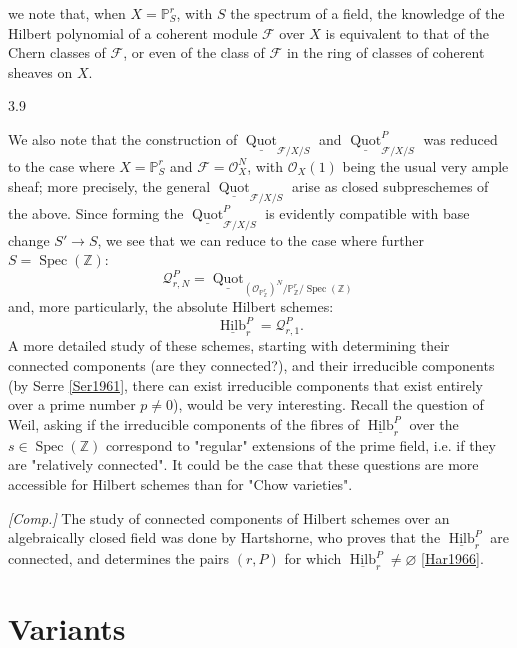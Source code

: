   we note that, when \(X=\mathbb {P}_S^r\), with \(S\) the spectrum of a field, the knowledge of the Hilbert polynomial of a coherent module \(\mathscr {F}\) over \(X\) is equivalent to that of the Chern classes of \(\mathscr {F}\), or even of the class of \(\mathscr {F}\) in the ring of classes of coherent sheaves on \(X\).\begin{remarks}{3.9}\label{fga3.iv-3-remarks-3.9}\skipsinglepar\par{}We also note that the construction of \(\underline {\operatorname {Quot}}_{{\mathscr {F}/X/S}}\) and \(\underline {\operatorname {Quot}}_{{\mathscr {F}/X/S}}^P\) was reduced to the case where \(X=\mathbb {P}_S^r\) and \(\mathscr {F}=\mathcal {O}_X^N\), with \(\mathcal {O}_X(1)\) being the usual very ample sheaf;
    more precisely, the general \(\underline {\operatorname {Quot}}_{{\mathscr {F}/X/S}}\) arise as closed subpreschemes of the above.
    Since forming the \(\underline {\operatorname {Quot}}_{{\mathscr {F}/X/S}}^P\) is evidently compatible with base change \(S'\to  S\), we see that we can reduce to the case where further \(S=\operatorname {Spec}(\mathbb {Z})\):
    \[       \mathscr {Q}_{r,N}^P       = \underline {\operatorname {Quot}}_{(\mathcal {O}_{\mathbb {P}_{\mathbb {Z}}^r})^N/\mathbb {P}_{\mathbb {Z}}^r/\operatorname {Spec}(\mathbb {Z})}     \]
    and, more particularly, the absolute Hilbert schemes:
    \[       \underline {\operatorname {Hilb}}_r^P       = \mathscr {Q}_{r,1}^P.     \]
    A more detailed study of these schemes, starting with determining their connected components (are they connected?), and their irreducible components (by Serre \hyperref[Ser1961]{[Ser1961]}, there can exist irreducible components that exist entirely over a prime number \(p\neq 0\)), would be very interesting.
    Recall the question of Weil, asking if the irreducible components of the fibres of \(\underline {\operatorname {Hilb}}_r^P\) over the \(s\in \operatorname {Spec}(\mathbb {Z})\) correspond to "regular" extensions of the prime field, i.e. if they are "relatively connected".
    It could be the case that these questions are more accessible for Hilbert schemes than for "Chow varieties".

    \emph{[Comp.]}
    The study of connected components of Hilbert schemes over an algebraically closed field was done by Hartshorne, who proves that the \(\underline {\operatorname {Hilb}}_r^P\) are connected, and determines the pairs \((r,P)\) for which \(\underline {\operatorname {Hilb}}_r^P\neq \varnothing \) \hyperref[Har1966]{[Har1966]}.\end{remarks}\chapter{Variants}\thispagestyle{fancy}\label{fga3.iv-4}\begin{enumerate}


\end{enumerate}
